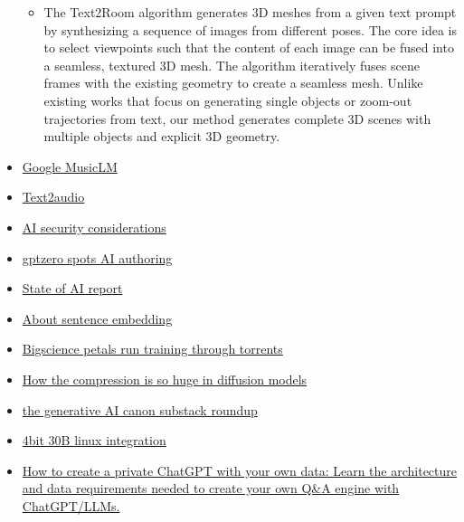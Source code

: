 \begin{itemize}
  \begin{itemize}
  \tightlist
  \item
    The Text2Room algorithm generates 3D meshes from a given text prompt
    by synthesizing a sequence of images from different poses. The core
    idea is to select viewpoints such that the content of each image can
    be fused into a seamless, textured 3D mesh. The algorithm
    iteratively fuses scene frames with the existing geometry to create
    a seamless mesh. Unlike existing works that focus on generating
    single objects or zoom-out trajectories from text, our method
    generates complete 3D scenes with multiple objects and explicit 3D
    geometry.
  \end{itemize}
\item
  \href{https://google-research.github.io/seanet/musiclm/examples/}{Google
  MusicLM}
\item
  \href{https://text-to-audio.github.io/}{Text2audio}
\item
  \href{https://ico.org.uk/for-organisations/guide-to-data-protection/key-dp-themes/guidance-on-ai-and-data-protection/how-should-we-assess-security-and-data-minimisation-in-ai/}{AI
  security considerations}
\item
  \href{http://gptzero.me/}{gptzero spots AI authoring}
\item
  \href{https://www.stateof.ai/}{State of AI report}
\item
  \href{https://txt.cohere.ai/sentence-word-embeddings/}{About sentence
  embedding}
\item
  \href{https://github.com/bigscience-workshop/petals}{Bigscience petals
  run training through torrents}
\item
  \href{https://medium.com/@socialemail/how-diffusion-models-can-achieve-seemingly-arbitrarily-large-compression-ratios-through-learning-2b21a317a46a}{How
  the compression is so huge in diffusion models}
\item
  \href{https://metavert.substack.com/p/the-generative-ai-canon}{the
  generative AI canon substack roundup}
\item
  \href{https://github.com/oobabooga/text-generation-webui/wiki/LLaMA-model}{4bit
  30B linux integration}
\item
  \href{https://medium.com/@imicknl/how-to-create-a-private-chatgpt-with-your-own-data-15754e6378a1}{How
  to create a private ChatGPT with your own data: Learn the architecture
  and data requirements needed to create your own Q\&A engine with
  ChatGPT/LLMs.}


\end{itemize}
